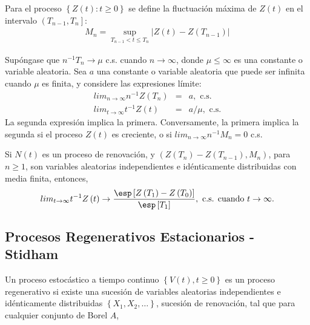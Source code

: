 \begin{Def}
Para el proceso $\left\{Z\left(t\right):t\geq0\right\}$ se define la fluctuaci\'on m\'axima de $Z\left(t\right)$ en el intervalo $\left(T_{n-1},T_{n}\right]$:
\begin{eqnarray*}
M_{n}=\sup_{T_{n-1}<t\leq T_{n}}|Z\left(t\right)-Z\left(T_{n-1}\right)|
\end{eqnarray*}
\end{Def}

\begin{Teo}
Sup\'ongase que $n^{-1}T_{n}\rightarrow\mu$ c.s. cuando $n\rightarrow\infty$, donde $\mu\leq\infty$ es una constante o variable aleatoria. Sea $a$ una constante o variable aleatoria que puede ser infinita cuando $\mu$ es finita, y considere las expresiones l\'imite:
\begin{eqnarray}
lim_{n\rightarrow\infty}n^{-1}Z\left(T_{n}\right)&=&a,\textrm{ c.s.}\\
lim_{t\rightarrow\infty}t^{-1}Z\left(t\right)&=&a/\mu,\textrm{ c.s.}
\end{eqnarray}
La segunda expresi\'on implica la primera. Conversamente, la primera implica la segunda si el proceso $Z\left(t\right)$ es creciente, o si $lim_{n\rightarrow\infty}n^{-1}M_{n}=0$ c.s.
\end{Teo}

\begin{Coro}
Si $N\left(t\right)$ es un proceso de renovaci\'on, y $\left(Z\left(T_{n}\right)-Z\left(T_{n-1}\right),M_{n}\right)$, para $n\geq1$, son variables aleatorias independientes e id\'enticamente distribuidas con media finita, entonces,
\begin{eqnarray}
lim_{t\rightarrow\infty}t^{-1}Z\left(t\right)\rightarrow\frac{\esp\left[Z\left(T_{1}\right)-Z\left(T_{0}\right)\right]}{\esp\left[T_{1}\right]},\textrm{ c.s. cuando  }t\rightarrow\infty.
\end{eqnarray}
\end{Coro}




\subsection{Procesos Regenerativos Estacionarios - Stidham \cite{Stidham}}


Un proceso estoc\'astico a tiempo continuo $\left\{V\left(t\right),t\geq0\right\}$ es un proceso regenerativo si existe una sucesi\'on de variables aleatorias independientes e id\'enticamente distribuidas $\left\{X_{1},X_{2},\ldots\right\}$, sucesi\'on de renovaci\'on, tal que para cualquier conjunto de Borel $A$, 

